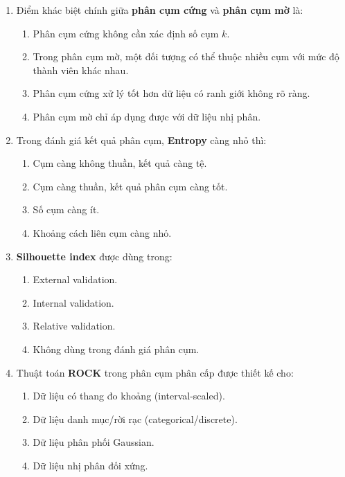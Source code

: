 \documentclass[10pt]{article}
\begin{document}
\begin{enumerate}[leftmargin=*, label=\textbf{Câu \arabic*.}]
    \item Điểm khác biệt chính giữa \textbf{phân cụm cứng} và \textbf{phân cụm mờ} là:
    \begin{enumerate}[label=\Alph*.]
        \item Phân cụm cứng không cần xác định số cụm $k$.
        \item Trong phân cụm mờ, một đối tượng có thể thuộc nhiều cụm với mức độ thành viên khác nhau.
        \item Phân cụm cứng xử lý tốt hơn dữ liệu có ranh giới không rõ ràng.
        \item Phân cụm mờ chỉ áp dụng được với dữ liệu nhị phân.
    \end{enumerate}

    \item Trong đánh giá kết quả phân cụm, \textbf{Entropy} càng nhỏ thì:
    \begin{enumerate}[label=\Alph*.]
        \item Cụm càng không thuần, kết quả càng tệ.
        \item Cụm càng thuần, kết quả phân cụm càng tốt.
        \item Số cụm càng ít.
        \item Khoảng cách liên cụm càng nhỏ.
    \end{enumerate}

    \item \textbf{Silhouette index} được dùng trong:
    \begin{enumerate}[label=\Alph*.]
        \item External validation.
        \item Internal validation.
        \item Relative validation.
        \item Không dùng trong đánh giá phân cụm.
    \end{enumerate}

    \item Thuật toán \textbf{ROCK} trong phân cụm phân cấp được thiết kế cho:
    \begin{enumerate}[label=\Alph*.]
        \item Dữ liệu có thang đo khoảng (interval-scaled).
        \item Dữ liệu danh mục/rời rạc (categorical/discrete).
        \item Dữ liệu phân phối Gaussian.
        \item Dữ liệu nhị phân đối xứng.
    \end{enumerate}


\end{enumerate}
\end{document}
